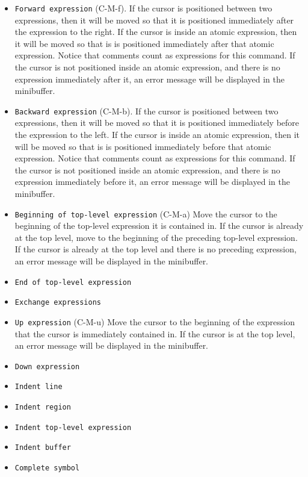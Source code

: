 \begin{itemize}
\item \texttt{Forward expression} (C-M-f).  If the cursor is
  positioned between two expressions, then it will be moved so that it
  is positioned immediately after the expression to the right.  If the
  cursor is inside an atomic expression, then it will be moved so that
  is is positioned immediately after that atomic expression.  Notice
  that comments count as expressions for this command.  If the cursor
  is not positioned inside an atomic expression, and there is no
  expression immediately after it, an error message will be displayed
  in the minibuffer.
\item \texttt{Backward expression} (C-M-b).  If the cursor is
  positioned between two expressions, then it will be moved so that it
  is positioned immediately before the expression to the left.  If the
  cursor is inside an atomic expression, then it will be moved so that
  is is positioned immediately before that atomic expression.  Notice
  that comments count as expressions for this command.  If the cursor
  is not positioned inside an atomic expression, and there is no
  expression immediately before it, an error message will be displayed
  in the minibuffer.
\item \texttt{Beginning of top-level expression} (C-M-a) Move the
  cursor to the beginning of the top-level expression it is contained
  in.  If the cursor is already at the top level, move to the beginning
  of the preceding top-level expression.  If the cursor is already at
  the top level and there is no preceding expression, an error message
  will be displayed in the minibuffer.
\item \texttt{End of top-level expression}
\item \texttt{Exchange expressions}
\item \texttt{Up expression} (C-M-u) Move the cursor to the beginning
  of the expression that the cursor is immediately contained in.  If
  the cursor is at the top level, an error message will be displayed
  in the minibuffer.
\item \texttt{Down expression}
\item \texttt{Indent line}
\item \texttt{Indent region}
\item \texttt{Indent top-level expression}
\item \texttt{Indent buffer}
\item \texttt{Complete symbol}
\end{itemize}


